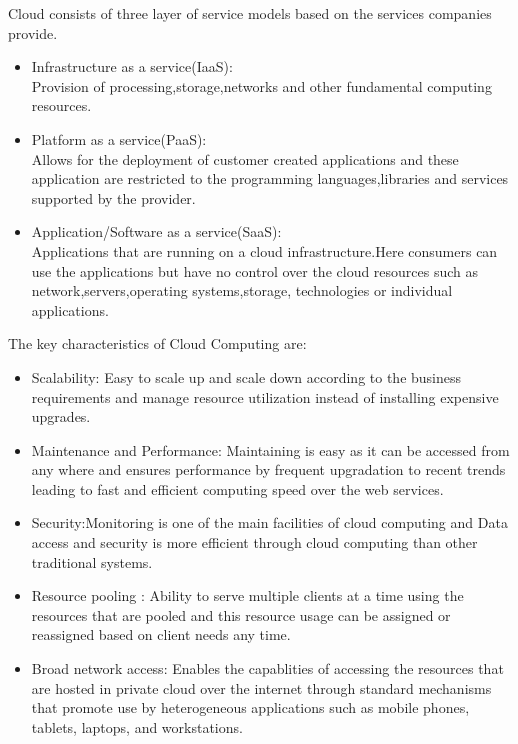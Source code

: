 Cloud consists of three layer of service models based on the services companies provide.\\
\begin{itemize}
	\item Infrastructure as a service(IaaS):\\
	Provision of processing,storage,networks and other fundamental computing resources\cite{mell2011nist}.\\
	\item Platform as a service(PaaS):\\
	Allows for the deployment of customer created applications and these application are restricted to the programming languages,libraries and services supported by the provider.\\
	\item Application/Software as a service(SaaS):\\
	Applications that are running on a cloud infrastructure.Here consumers can use the applications but have no control over the cloud resources such as network,servers,operating systems,storage, technologies or individual applications\cite{mell2011nist}.\\
\end{itemize}
The key characteristics of Cloud Computing are:\\
\begin{itemize}
	\item Scalability: Easy to scale up and scale down according to the business requirements and manage resource utilization instead of installing expensive upgrades.\\
	\item Maintenance and Performance: Maintaining is easy as it can be accessed from any where and ensures performance by frequent upgradation to recent trends leading to fast and efficient computing speed over the web services.\\
	\item Security:Monitoring is one of the main facilities of cloud computing and Data access and security is more efficient through cloud computing than other traditional systems.\\
	\item Resource pooling : Ability to serve multiple clients at a time using the resources that are pooled and this resource usage can be assigned or reassigned based on client needs any time.\\
	\item Broad network access: Enables the capablities of accessing the resources that are hosted in private cloud over the internet through standard mechanisms that promote use by heterogeneous applications such as mobile phones, tablets, laptops, and workstations.
\end{itemize}
\newpage
